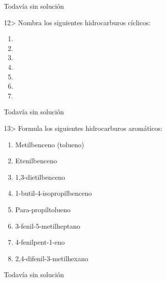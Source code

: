 \documentclass{article}
\begin{document}
\begin{solution}[print=false]
  Todavía sin solución
\end{solution}

\begin{exercise}
  12> Nombra los siguientes hidrocarburos cíclicos:
  \begin{enumerate}
    \item {}
    \item {}
    \item {}
    \item {}
    \item {}
    \item {}
    \item {}
  \end{enumerate}
\end{exercise}

\begin{solution}[print=false]
  Todavía sin solución
\end{solution}

\begin{exercise}
  13> Formula los siguientes hidrocarburos aromáticos:
  \begin{enumerate}
    \item Metilbenceno (tolueno)
    \item Etenilbenceno
    \item 1,3-dietilbenceno
    \item 1-butil-4-isopropilbenceno
    \item Para-propiltolueno
    \item 3-fenil-5-metilheptano
    \item 4-fenilpent-1-eno
    \item 2,4-difenil-3-metilhexano
  \end{enumerate}
\end{exercise}

\begin{solution}[print=false]
  Todavía sin solución
\end{solution}
\end{document}
